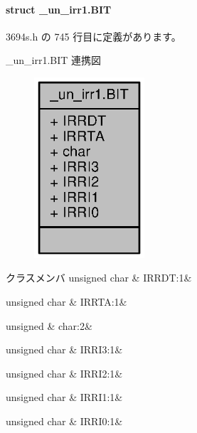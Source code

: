 \paragraph{struct \+\_\+un\+\_\+irr1.\+B\+I\+T}


 3694s.\+h の 745 行目に定義があります。



\+\_\+un\+\_\+irr1.\+B\+I\+T 連携図
\nopagebreak
\begin{figure}[H]
\begin{center}
\leavevmode
\includegraphics[width=116pt]{db/d21/struct__un__irr1_8BIT__coll__graph}
\end{center}
\end{figure}
\begin{DoxyFields}{クラスメンバ}
unsigned char\label{3694s_8h_ae1d36efc5696cc2692f2dd8fddee6974}
&
I\+R\+R\+D\+T\+:1&
\\
\hline

unsigned char\label{3694s_8h_a7d2ec232699a3729836db1001d09a08f}
&
I\+R\+R\+T\+A\+:1&
\\
\hline

unsigned\label{3694s_8h_aa87deb01c5f539e6bda34829c8ef2368}
&
char\+:2&
\\
\hline

unsigned char\label{3694s_8h_ad459d1a1706f1650402605b0e9f41c58}
&
I\+R\+R\+I3\+:1&
\\
\hline

unsigned char\label{3694s_8h_a9816b344c5540e7a5b5bffd52de20b65}
&
I\+R\+R\+I2\+:1&
\\
\hline

unsigned char\label{3694s_8h_a49e7cc812ea08cb3caf36778fe23b0bb}
&
I\+R\+R\+I1\+:1&
\\
\hline

unsigned char\label{3694s_8h_a785922002525434e67ab592d81cf174c}
&
I\+R\+R\+I0\+:1&
\\
\hline

\end{DoxyFields}
\label{struct__un__iwpr_8BIT}
